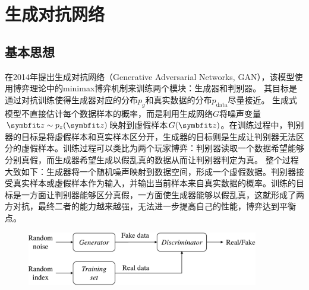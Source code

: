 

\section{生成对抗网络}
\subsection{基本思想}
\citet{goodfellow2014generative}在2014年提出生成对抗网络（Generative Adversarial Networks, GAN），该模型使用博弈理论中的minimax博弈机制来训练两个模块：生成器和判别器。
其目标是通过对抗训练使得生成器对应的分布$p_g$和真实数据的分布$p_{\text{data}}$尽量接近。
生成式模型不直接估计每个数据样本的概率，而是利用生成网络$G$将噪声变量$\bd{z} \sim p_z(\bd{z})$映射到虚假样本$G(\bd{z})$。在训练过程中，判别器的目标是将虚假样本和真实样本区分开，生成器的目标则是生成让判别器无法区分的虚假样本。训练过程可以类比为两个玩家博弈：判别器读取一个数据希望能够分别真假，而生成器希望生成以假乱真的数据从而让判别器判定为真。 整个过程大致如下：生成器将一个随机噪声映射到数据空间，形成一个虚假数据。判别器接受真实样本或虚假样本作为输入，并输出当前样本来自真实数据的概率。训练的目标是一方面让判别器能够区分真假，一方面使生成器能够以假乱真，这就形成了两方对抗，最终二者的能力越来越强，无法进一步提高自己的性能，博弈达到平衡点。
\begin{figure}[htbp]
  \centering
  \includegraphics[width=0.9\textwidth]{Img/arch-gan.pdf}
  \label{fig:arch-gan}
\end{figure}

